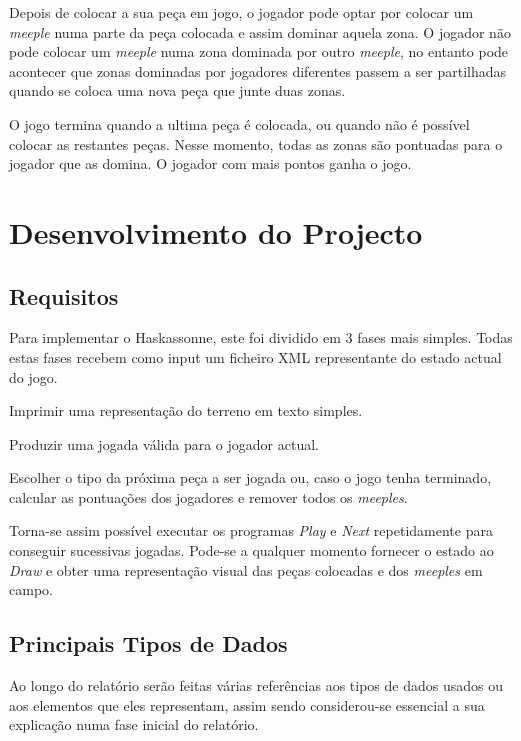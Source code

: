 \documentclass[11pt, a4paper, twoside]{article}
\begin{document}
Depois de colocar a sua peça em jogo, o jogador pode optar por colocar um \textit{meeple} numa parte da peça colocada e assim dominar aquela zona. O jogador não pode colocar um \textit{meeple} numa zona dominada por outro \textit{meeple}, no entanto pode acontecer que zonas dominadas por jogadores diferentes passem a ser partilhadas quando se coloca uma nova peça que junte duas zonas.

O jogo termina quando a ultima peça é colocada, ou quando não é possível colocar as restantes peças. Nesse momento, todas as zonas são pontuadas para o jogador que as domina. O jogador com mais pontos ganha o jogo.

\newpage
\section{Desenvolvimento do Projecto}

\subsection{Requisitos}

Para implementar o Haskassonne, este foi dividido em 3 fases mais simples.
Todas estas fases recebem como input um ficheiro XML representante do estado actual do jogo.

\begin{description}[style=multiline,leftmargin=1.5cm,font=\bfseries]
    \item[Draw] Imprimir uma representação do terreno em texto simples.
    \item[Play] Produzir uma jogada válida para o jogador actual.
    \item[Next] Escolher o tipo da próxima peça a ser jogada ou, caso o jogo tenha terminado, calcular as pontuações dos jogadores e remover todos os \textit{meeples}.
\end{description}

Torna-se assim possível executar os programas \textit{Play} e \textit{Next} repetidamente para conseguir sucessivas jogadas. Pode-se a qualquer momento fornecer o estado ao \textit{Draw} e obter uma representação visual das peças colocadas e dos \textit{meeples} em campo.

\subsection{Principais Tipos de Dados}

Ao longo do relatório serão feitas várias referências aos tipos de dados usados ou aos elementos que eles representam, assim sendo considerou-se essencial a sua explicação numa fase inicial do relatório.
\end{document}
